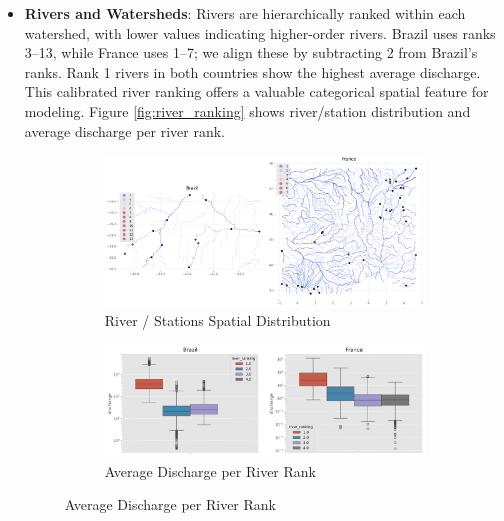 \documentclass[ruler]{CUP-JNL-EDS}%
\begin{document}
\begin{itemize}
    \item{\textbf{Rivers and Watersheds}}: Rivers are hierarchically ranked within each watershed, with lower values indicating 
    higher-order rivers. Brazil uses ranks 3–13, while France uses 1–7; we align these by subtracting 2 from Brazil’s ranks. 
    Rank 1 rivers in both countries show the highest average discharge. This calibrated river ranking offers a 
    valuable categorical spatial feature for modeling. Figure \ref{fig:river_ranking} shows river/station distribution and average discharge per river rank.\\
    \begin{figure}[h]
        \centering
        \begin{subfigure}[h]{1.0\textwidth}
            \centering
            \includegraphics[width=\textwidth]{./assets/images/watershed_river_ranking.png}
            \caption{River / Stations Spatial Distribution}
            \label{fig:river_ranking_map}
        \end{subfigure}

        \begin{subfigure}[h]{1.0\textwidth}
            \centering
            \includegraphics[width=\textwidth]{./assets/images/river_ranking_average_discharge.png}
            \caption{Average Discharge per River Rank}
            \label{fig:river_ranking_average_discharge}
        \end{subfigure}


\end{figure}
\end{itemize}
\end{document}
